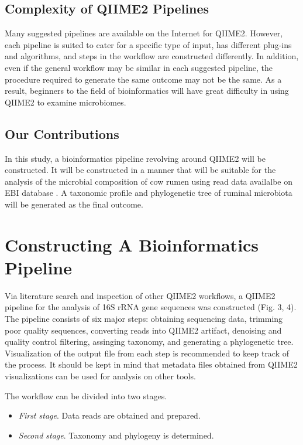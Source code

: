\documentclass{singlecol-new}
\theoremstyle{TH}{
\newtheorem{lemma}{Lemma}
\newtheorem{theorem}[lemma]{Theorem}
\newtheorem{corrolary}[lemma]{Corrolary}
\newtheorem{conjecture}[lemma]{Conjecture}
\newtheorem{proposition}[lemma]{Proposition}
\newtheorem{claim}[lemma]{Claim}
\newtheorem{stheorem}[lemma]{Wrong Theorem}
\newtheorem{algorithm}{Algorithm}
}
\theoremstyle{THrm}{
\newtheorem{definition}{Definition}[section]
\newtheorem{question}{Question}[section]
\newtheorem{remark}{Remark}
\newtheorem{scheme}{Scheme}
}
\theoremstyle{THhit}{
\newtheorem{case}{Case}[section]
}
\begin{document}
\subsection{Complexity of QIIME2 Pipelines}

Many suggested pipelines are available on the Internet for QIIME2. However, each pipeline is suited to cater for a specific type of input, has different plug-ins and algorithms, and steps in the workflow are constructed differently. In addition, even if the general workflow may be similar in each suggested pipeline, the procedure required to generate the same outcome may not be the same. As a result, beginners to the field of bioinformatics will have great difficulty in using QIIME2 to examine microbiomes. 

\subsection{Our Contributions}

In this study, a bioinformatics pipeline revolving around QIIME2 will be constructed. It will be constructed in a manner that will be suitable for the analysis of the microbial composition of cow rumen using read data availalbe on EBI database \citep{lopez2018comparison}. A taxonomic profile and phylogenetic tree of ruminal microbiota will be generated as the final outcome.  

\section{Constructing A Bioinformatics Pipeline} 

Via literature search and inspection of other QIIME2 workflows, a QIIME2 pipeline for the analysis of 16S rRNA gene sequences was constructed (Fig. 3, 4). The pipeline consists of six major steps: obtaining sequencing data, trimming poor quality sequences, converting  reads into QIIME2 artifact, denoising and quality control filtering, assinging taxonomy, and generating a phylogenetic tree. Visualization of the output file from each step is recommended to keep track of the process. It should be kept in mind that metadata files obtained from QIIME2 visualizations can be used for analysis on other tools.\linebreak

The workflow can be divided into two stages. 

\begin{itemize}

\item {\em First stage}. Data reads are obtained and prepared.
\item {\em Second stage}. Taxonomy and phylogeny is determined.

\end{itemize}
\end{document}
